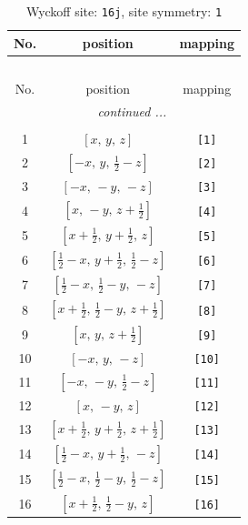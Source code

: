 \documentclass[fleqn,8pt]{jsarticle}
\begin{document}
\begin{longtable}{ccc}
\caption{Wyckoff site: {\tt 16j}, site symmetry: {\tt 1}}
 \\
 \hline \hline
No. & position & mapping \\ \hline \endfirsthead

\multicolumn{2}{l}{\tablename\ \thetable{}} \\
 \hline \hline
No. & position & mapping \\ \hline \endhead

 \hline \hline
\multicolumn{2}{r}{\footnotesize\it continued ...} \\ \endfoot

 \hline \hline
\multicolumn{2}{r}{} \\ \endlastfoot

1 & $\left[ x,\, y,\, z \right]$ & {\tt [1]} \\ \hline
2 & $\left[ - x,\, y,\, \frac{1}{2} - z \right]$ & {\tt [2]} \\ \hline
3 & $\left[ - x,\, - y,\, - z \right]$ & {\tt [3]} \\ \hline
4 & $\left[ x,\, - y,\, z + \frac{1}{2} \right]$ & {\tt [4]} \\ \hline
5 & $\left[ x + \frac{1}{2},\, y + \frac{1}{2},\, z \right]$ & {\tt [5]} \\ \hline
6 & $\left[ \frac{1}{2} - x,\, y + \frac{1}{2},\, \frac{1}{2} - z \right]$ & {\tt [6]} \\ \hline
7 & $\left[ \frac{1}{2} - x,\, \frac{1}{2} - y,\, - z \right]$ & {\tt [7]} \\ \hline
8 & $\left[ x + \frac{1}{2},\, \frac{1}{2} - y,\, z + \frac{1}{2} \right]$ & {\tt [8]} \\ \hline
9 & $\left[ x,\, y,\, z + \frac{1}{2} \right]$ & {\tt [9]} \\ \hline
10 & $\left[ - x,\, y,\, - z \right]$ & {\tt [10]} \\ \hline
11 & $\left[ - x,\, - y,\, \frac{1}{2} - z \right]$ & {\tt [11]} \\ \hline
12 & $\left[ x,\, - y,\, z \right]$ & {\tt [12]} \\ \hline
13 & $\left[ x + \frac{1}{2},\, y + \frac{1}{2},\, z + \frac{1}{2} \right]$ & {\tt [13]} \\ \hline
14 & $\left[ \frac{1}{2} - x,\, y + \frac{1}{2},\, - z \right]$ & {\tt [14]} \\ \hline
15 & $\left[ \frac{1}{2} - x,\, \frac{1}{2} - y,\, \frac{1}{2} - z \right]$ & {\tt [15]} \\ \hline
16 & $\left[ x + \frac{1}{2},\, \frac{1}{2} - y,\, z \right]$ & {\tt [16]} \\
\end{longtable}
\end{document}
